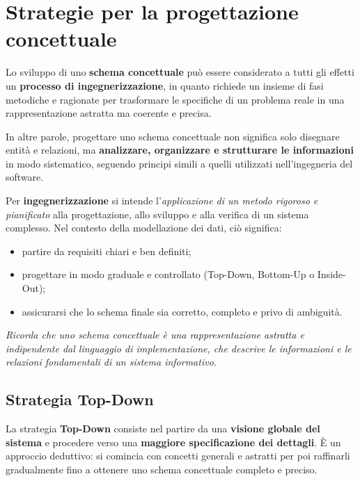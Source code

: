 \section{Strategie per la progettazione concettuale}

Lo sviluppo di uno \textbf{schema concettuale} può essere considerato a tutti gli effetti un \textbf{processo di ingegnerizzazione}, in quanto richiede un insieme di fasi metodiche e ragionate per trasformare le specifiche di un problema reale in una rappresentazione astratta ma coerente e precisa.  

In altre parole, progettare uno schema concettuale non significa solo disegnare entità e relazioni, ma \textbf{analizzare, organizzare e strutturare le informazioni} in modo sistematico, seguendo principi simili a quelli utilizzati nell’ingegneria del software.

\begin{tcolorbox}[colback=yellow!20,colframe=yellow!50!black,title={\textbf{Nota Bene}},boxrule=0.8pt,arc=2mm]
Per \textbf{ingegnerizzazione} si intende l’\textit{applicazione di un metodo rigoroso e pianificato} alla progettazione, allo sviluppo e alla verifica di un sistema complesso.  
Nel contesto della modellazione dei dati, ciò significa:  
\begin{itemize}
  \item partire da requisiti chiari e ben definiti;
  \item progettare in modo graduale e controllato (Top-Down, Bottom-Up o Inside-Out);
  \item assicurarsi che lo schema finale sia corretto, completo e privo di ambiguità.
\end{itemize}
\end{tcolorbox}

\begin{center}
\textit{Ricorda che uno schema concettuale è una rappresentazione astratta e indipendente dal linguaggio di implementazione, che descrive le informazioni e le relazioni fondamentali di un sistema informativo.}
\end{center}

\subsection{Strategia Top-Down}

La strategia \textbf{Top-Down} consiste nel partire da una \textbf{visione globale del sistema} e procedere verso una \textbf{maggiore specificazione dei dettagli}.  
È un approccio deduttivo: si comincia con concetti generali e astratti per poi raffinarli gradualmente fino a ottenere uno schema concettuale completo e preciso.

